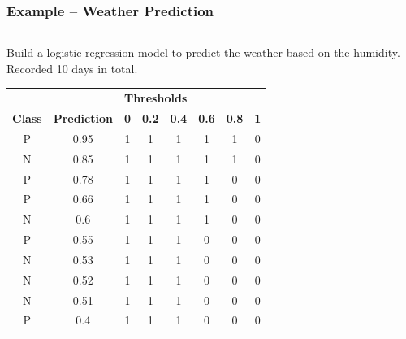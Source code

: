 \documentclass[aspectratio=169, 10pt]{beamer}
\begin{document}
\begin{frame}
    \frametitle{Example -- Weather Prediction}
    \small
    
    \begin{columns}
        \begin{column}{0.5\textwidth}
            Build a logistic regression model to predict the weather based on the humidity. \\
            Recorded 10 days in total.
            
            \begin{table}[]
                \begin{tabular}{cc|cccccc}
                \textbf{}      & \textbf{}           & \multicolumn{6}{l}{\textbf{Thresholds}}                                             \\
                \textbf{Class} & \textbf{Prediction} & \textbf{0} & \textbf{0.2} & \textbf{0.4} & \textbf{0.6} & \textbf{0.8} & \textbf{1} \\ \hline
                P              & 0.95                & 1          & 1            & 1            & 1            & 1            & 0          \\
                N              & 0.85                & 1          & 1            & 1            & 1            & 1            & 0          \\
                P              & 0.78                & 1          & 1            & 1            & 1            & 0            & 0          \\
                P              & 0.66                & 1          & 1            & 1            & 1            & 0            & 0          \\
                N              & 0.6                 & 1          & 1            & 1            & 1            & 0            & 0          \\
                P              & 0.55                & 1          & 1            & 1            & 0            & 0            & 0          \\
                N              & 0.53                & 1          & 1            & 1            & 0            & 0            & 0          \\
                N              & 0.52                & 1          & 1            & 1            & 0            & 0            & 0          \\
                N              & 0.51                & 1          & 1            & 1            & 0            & 0            & 0          \\
                P              & 0.4                 & 1          & 1            & 1            & 0            & 0            & 0         
                \end{tabular}
                \end{table}


\end{column}
\end{columns}
\end{frame}
\end{document}
